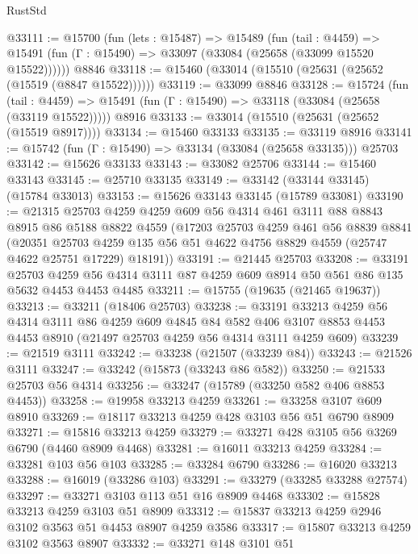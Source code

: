 \begin{lexlean}{RustStd}
\begin{coremodule}
@33111 := @15700
    (fun (lets : @15487) =>
    @15489
      (fun (tail : @4459) =>
      @15491 (fun (Γ : @15490) => @33097 (@33084 (@25658 (@33099 @15520 @15522))))))
    @8846
@33118 := @15460 (@33014 (@15510 (@25631 (@25652 (@15519 (@8847 @15522))))))
@33119 := @33099 @8846
@33128 := @15724
    (fun (tail : @4459) => @15491 (fun (Γ : @15490) => @33118 (@33084 (@25658 (@33119 @15522)))))
    @8916
@33133 := @33014 (@15510 (@25631 (@25652 (@15519 @8917))))
@33134 := @15460 @33133
@33135 := @33119 @8916
@33141 := @15742 (fun (Γ : @15490) => @33134 (@33084 (@25658 @33135))) @25703
@33142 := @15626 @33133
@33143 := @33082 @25706
@33144 := @15460 @33143
@33145 := @25710 @33135
@33149 := @33142 (@33144 @33145) (@15784 @33013)
@33153 := @15626 @33143 @33145 (@15789 @33081)
@33190 := @21315
    @25703
    @4259
    @4259
    @609
    @56
    @4314
    @461
    @3111
    @88
    @8843
    @8915
    @86
    @5188
    @8822
    @4559
    (@17203
      @25703
      @4259
      @461
      @56
      @8839
      @8841
      (@20351
        @25703
        @4259
        @135
        @56
        @51
        @4622
        @4756
        @8829
        @4559
        (@25747 @4622 @25751 @17229)
        @18191))
@33191 := @21445 @25703
@33208 := @33191
    @25703
    @4259
    @56
    @4314
    @3111
    @87
    @4259
    @609
    @8914
    @50
    @561
    @86
    @135
    @5632
    @4453
    @4453
    @4485
@33211 := @15755 (@19635 (@21465 @19637))
@33213 := @33211 (@18406 @25703)
@33238 := @33191
    @33213
    @4259
    @56
    @4314
    @3111
    @86
    @4259
    @609
    @4845
    @84
    @582
    @406
    @3107
    @8853
    @4453
    @4453
    @8910
    (@21497 @25703 @4259 @56 @4314 @3111 @4259 @609)
@33239 := @21519 @3111
@33242 := @33238 (@21507 (@33239 @84))
@33243 := @21526 @3111
@33247 := @33242 (@15873 (@33243 @86 @582))
@33250 := @21533 @25703 @56 @4314
@33256 := @33247 (@15789 (@33250 @582 @406 @8853 @4453))
@33258 := @19958 @33213 @4259
@33261 := @33258 @3107 @609 @8910
@33269 := @18117 @33213 @4259 @428 @3103 @56 @51 @6790 @8909
@33271 := @15816 @33213 @4259
@33279 := @33271 @428 @3105 @56 @3269 @6790 (@4460 @8909 @4468)
@33281 := @16011 @33213 @4259
@33284 := @33281 @103 @56 @103
@33285 := @33284 @6790
@33286 := @16020 @33213
@33288 := @16019 (@33286 @103)
@33291 := @33279 (@33285 @33288 @27574)
@33297 := @33271 @3103 @113 @51 @16 @8909 @4468
@33302 := @15828 @33213 @4259 @3103 @51 @8909
@33312 := @15837 @33213 @4259 @2946 @3102 @3563 @51 @4453 @8907 @4259 @3586
@33317 := @15807 @33213 @4259 @3102 @3563 @8907
@33332 := @33271
    @148
    @3101
    @51

\end{coremodule}
\end{lexlean}
